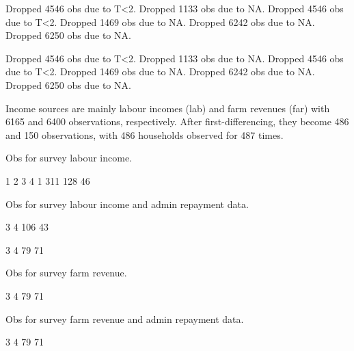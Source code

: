 \begin{Schunk}
\begin{Soutput}
Dropped 4546 obs due to T<2.
Dropped 1133 obs due to NA.
Dropped 4546 obs due to T<2.
Dropped 1469 obs due to NA.
Dropped 6242 obs due to NA.
Dropped 6250 obs due to NA.
\end{Soutput}
\end{Schunk}
\begin{Schunk}
\begin{Soutput}
Dropped 4546 obs due to T<2.
Dropped 1133 obs due to NA.
Dropped 4546 obs due to T<2.
Dropped 1469 obs due to NA.
Dropped 6242 obs due to NA.
Dropped 6250 obs due to NA.
\end{Soutput}
\end{Schunk}

Income sources are mainly labour incomes (\textsf{lab}) and farm revenues (\textsf{far}) with 6165 and 6400 observations, respectively. After first-differencing, they become 486 and 150 observations, with 486 households observed for 487 times. 


Obs for survey labour income.
\begin{Schunk}
\begin{Soutput}

  1   2   3   4 
  1 311 128  46 
\end{Soutput}
\end{Schunk}
Obs for survey labour income and admin repayment data.
\begin{Schunk}
\begin{Soutput}

  3   4 
106  43 
\end{Soutput}
\begin{Soutput}

 3  4 
79 71 
\end{Soutput}
\end{Schunk}
Obs for survey farm revenue.
\begin{Schunk}
\begin{Soutput}

 3  4 
79 71 
\end{Soutput}
\end{Schunk}
Obs for survey farm revenue and admin repayment data.
\begin{Schunk}
\begin{Soutput}

 3  4 
79 71 
\end{Soutput}
\end{Schunk}







